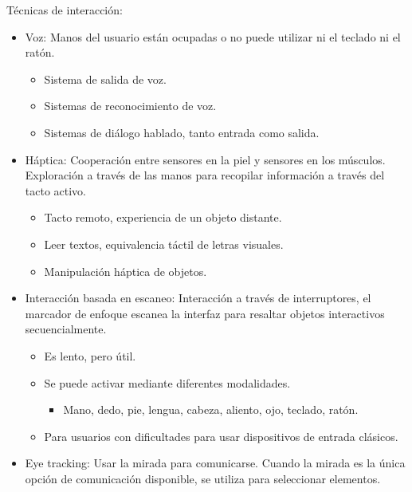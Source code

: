 \documentclass[12pt, twoside, openright]{report} %
\begin{document}
  Técnicas de interacción:

  \begin{itemize}
  
  \item
    Voz: Manos del usuario están ocupadas o no puede utilizar ni el
    teclado ni el ratón.

    \begin{itemize}
    
    \item
      Sistema de salida de voz.
    \item
      Sistemas de reconocimiento de voz.
    \item
      Sistemas de diálogo hablado, tanto entrada como salida.
    \end{itemize}
  \item
    Háptica: Cooperación entre sensores en la piel y sensores en los
    músculos. Exploración a través de las manos para recopilar
    información a través del tacto activo.

    \begin{itemize}
    
    \item
      Tacto remoto, experiencia de un objeto distante.
    \item
      Leer textos, equivalencia táctil de letras visuales.
    \item
      Manipulación háptica de objetos.
    \end{itemize}
  \item
    Interacción basada en escaneo: Interacción a través de
    interruptores, el marcador de enfoque escanea la interfaz para
    resaltar objetos interactivos secuencialmente.

    \begin{itemize}
    
    \item
      Es lento, pero útil.
    \item
      Se puede activar mediante diferentes modalidades.

      \begin{itemize}
      
      \item
        Mano, dedo, pie, lengua, cabeza, aliento, ojo, teclado, ratón.
      \end{itemize}
    \item
      Para usuarios con dificultades para usar dispositivos de entrada
      clásicos.
    \end{itemize}
  \item
    Eye tracking: Usar la mirada para comunicarse. Cuando la mirada es
    la única opción de comunicación disponible, se utiliza para
    seleccionar elementos.


\end{itemize}
\end{document}
